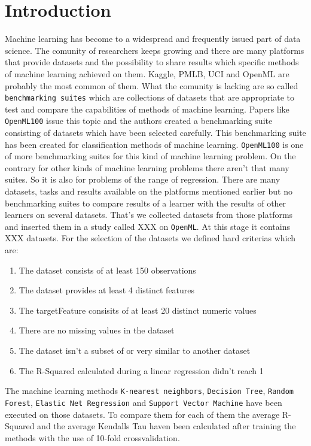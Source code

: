 \documentclass[a4paper]{article}
\begin{document}
\section{Introduction}
Machine learning has become to a widespread and frequently issued part of data science. The comunity of researchers keeps growing and there are many platforms that provide datasets and the possibility to share results which specific methods of machine learning achieved on them. Kaggle, PMLB, UCI and OpenML are probably the most common of them. 
\newline 
What the comunity is lacking are so called \texttt{benchmarking suites} which are collections of datasets that are appropriate to test and compare the capabilities of methods of machine learning. 
Papers like \texttt{OpenML100} issue this topic and the authors created a benchmarking suite consisting of datasets which have been selected carefully. This benchmarking suite has been created for classification methods of machine learning. \newline 
\texttt{OpenML100} is one of more benchmarking suites for this kind of machine learning problem. \newline 
On the contrary for other kinds of machine learning problems there aren't that many suites. \newline 
So it is also for problems of the range of regression. There are many datasets, tasks and results available on the platforms mentioned earlier but no benchmarking suites to compare results of a learner with the results of other learners on several datasets. That's we collected datasets from those platforms and inserted them in a study called XXX on \texttt{OpenML}. 
At this stage it contains XXX datasets.
For the selection of the datasets we defined hard criterias which are: 
\begin{enumerate}
	\item The dataset consists of at least 150 observations 
	\item The dataset provides at least 4 distinct features 
	\item The targetFeature consisits of at least 20 distinct numeric values 
	\item There are no missing values in the dataset 
	\item The dataset isn't a subset of or very similar to another dataset 
	\item The R-Squared calculated during a linear regression didn't reach 1
\end{enumerate}
The machine learning methods \texttt{K-nearest neighbors}, \texttt{Decision Tree}, \texttt{Random Forest}, \texttt{Elastic Net Regression} and \texttt{Support Vector Machine} have been executed on those datasets. 
\newline 
To compare them for each of them the average R-Squared and the average Kendalls Tau haven been calculated after training the methods with the use of 10-fold crossvalidation.
\end{document}
